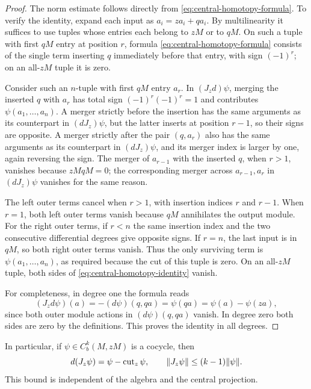 \begin{proof}
The norm estimate follows directly from
\eqref{eq:central-homotopy-formula}.  To verify the identity, expand
each input as $a_i=za_i+qa_i$.  By multilinearity it suffices to
use tuples whose entries each belong to $zM$ or to $qM$.  On such
a tuple with first $qM$ entry at position $r$, formula
\eqref{eq:central-homotopy-formula} consists of the single term
inserting $q$ immediately before that entry, with sign $(-1)^r$;
on an all-$zM$ tuple it is zero.

Consider such an $n$-tuple with first $qM$ entry $a_r$.
In $(J_zd)\psi$, merging the inserted $q$ with $a_r$ has total
sign $(-1)^r(-1)^r=1$ and contributes
$\psi(a_1,\ldots,a_n)$.  A merger strictly before the insertion
has the same arguments as its counterpart in $(dJ_z)\psi$,
but the latter inserts at position $r-1$, so their signs are
opposite.  A merger strictly after the pair $(q,a_r)$ also has
the same arguments as its counterpart in $(dJ_z)\psi$, and its
merger index is larger by one, again reversing the sign.  The
merger of $a_{r-1}$ with the inserted $q$, when $r>1$, vanishes
because $zMqM=0$; the corresponding merger across $a_{r-1},a_r$
in $(dJ_z)\psi$ vanishes for the same reason.

The left outer terms cancel when $r>1$, with insertion indices
$r$ and $r-1$.  When $r=1$, both left outer terms vanish because
$qM$ annihilates the output module.  For the right outer terms,
if $r<n$ the same insertion index and the two consecutive
differential degrees give opposite signs.  If $r=n$, the last
input is in $qM$, so both right outer terms vanish.  Thus the
only surviving term is $\psi(a_1,\ldots,a_n)$, as required
because the cut of this tuple is zero.  On an all-$zM$ tuple,
both sides of \eqref{eq:central-homotopy-identity} vanish.

For completeness, in degree one the formula reads
\[
 (J_zd\psi)(a)=-(d\psi)(q,qa)=\psi(qa)
 =\psi(a)-\psi(za),
\]
since both outer module actions in $(d\psi)(q,qa)$ vanish.
In degree zero both sides are zero by the definitions.  This
proves the identity in all degrees.
\end{proof}

In particular, if $\psi\in C_b^k(M,zM)$ is a cocycle, then
\begin{equation}\label{eq:central-cocycle-correction}
 d(J_z\psi)=\psi-\operatorname{cut}_z\psi,
 \qquad \lVert J_z\psi\rVert\le(k-1)\lVert\psi\rVert.
\end{equation}
This bound is independent of the algebra and the central projection.

